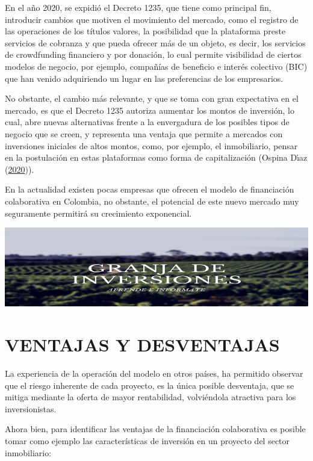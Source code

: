 \documentclass[
]{book}
\begin{document}
En el año 2020, se expidió el Decreto 1235, que tiene como principal fin, introducir cambios que motiven el movimiento del mercado, como el registro de las operaciones de los títulos valores, la posibilidad que la plataforma preste servicios de cobranza y que pueda ofrecer más de un objeto, es decir, los servicios de crowdfunding financiero y por donación, lo cual permite visibilidad de ciertos modelos de negocio, por ejemplo, compañías de beneficio e interés colectivo (BIC) que han venido adquiriendo un lugar en las preferencias de los empresarios.

No obstante, el cambio más relevante, y que se toma con gran expectativa en el mercado, es que el Decreto 1235 autoriza aumentar los montos de inversión, lo cual, abre nuevas alternativas frente a la envergadura de los posibles tipos de negocio que se creen, y representa una ventaja que permite a mercados con inversiones iniciales de altos montos, como, por ejemplo, el inmobiliario, pensar en la postulación en estas plataformas como forma de capitalización (Ospina Dı́az (\protect\hyperlink{ref-Ospina2020Colombia}{2020})).

En la actualidad existen pocas empresas que ofrecen el modelo de financiación colaborativa en Colombia, no obstante, el potencial de este nuevo mercado muy seguramente permitirá su crecimiento exponencial.

\includegraphics[width=1\linewidth,height=0.3\textheight]{imagenes/Granja1}

\hypertarget{ventajas-y-desventajas}{%
\chapter{VENTAJAS Y DESVENTAJAS}\label{ventajas-y-desventajas}}

La experiencia de la operación del modelo en otros países, ha permitido observar que el riesgo inherente de cada proyecto, es la única posible desventaja, que se mitiga mediante la oferta de mayor rentabilidad, volviéndola atractiva para los inversionistas.

Ahora bien, para identificar las ventajas de la financiación colaborativa es posible tomar como ejemplo las características de inversión en un proyecto del sector inmobiliario:
\end{document}

